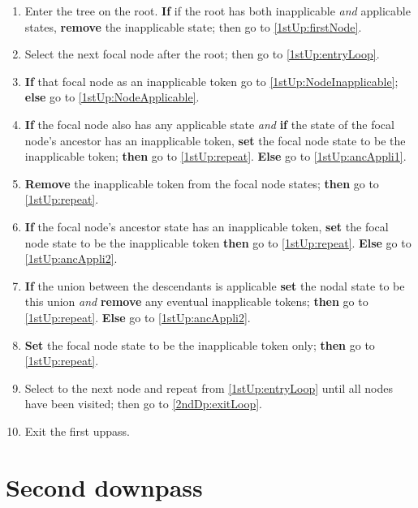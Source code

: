 \documentclass[a4paper,12pt]{article}
\begin{document}
\begin{enumerate}
    \item Enter the tree on the root. \textbf{If} if the root has both inapplicable \textit{and} applicable states, \textbf{remove} the inapplicable state; then go to \ref{1stUp:firstNode}.
    \item \label{1stUp:firstNode} Select the next focal node after the root; then go to \ref{1stUp:entryLoop}. 
    \item \label{1stUp:entryLoop} \textbf{If} that focal node as an inapplicable token go to \ref{1stUp:NodeInapplicable}; \textbf{else} go to \ref{1stUp:NodeApplicable}.
    \item \label{1stUp:NodeInapplicable} \textbf{If} the focal node also has any applicable state \textit{and} \textbf{if} the state of the focal node's ancestor has an inapplicable token, \textbf{set} the focal node state to be the inapplicable token; \textbf{then} go to \ref{1stUp:repeat}. \textbf{Else} go to \ref{1stUp:ancAppli1}.
    \item \label{1stUp:ancAppli1} \textbf{Remove} the inapplicable token from the focal node states; \textbf{then} go to \ref{1stUp:repeat}.
    \item \label{1stUp:NodeApplicable} \textbf{If} the focal node's ancestor state has an inapplicable token, \textbf{set} the focal node state to be the inapplicable token \textbf{then} go to \ref{1stUp:repeat}. \textbf{Else} go to \ref{1stUp:ancAppli2}.
    \item \label{1stUp:ancAppli2} \textbf{If} the union between the descendants is applicable \textbf{set} the nodal state to be this union \textit{and} \textbf{remove} any eventual inapplicable tokens; \textbf{then} go to \ref{1stUp:repeat}. \textbf{Else} go to \ref{1stUp:ancAppli2}.
    \item \label{1stUp:ancAppli3} \textbf{Set} the focal node state to be the inapplicable token only; \textbf{then} go to \ref{1stUp:repeat}.
    \item \label{1stUp:repeat} Select to the next node and repeat from \ref{1stUp:entryLoop} until all nodes have been visited; then go to \ref{2ndDp:exitLoop}.
    \item \label{1stUp:exitLoop} Exit the first uppass.
\end{enumerate}


\section{Second downpass} \label{2ndDp}
\end{document}
